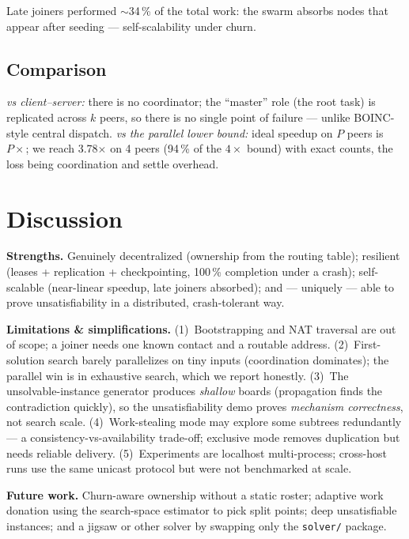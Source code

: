\documentclass[11pt,a4paper]{article}
\newcommand{\code}[1]{\texttt{#1}}
\begin{document}
Late joiners performed $\sim$34\,\% of the total work: the swarm absorbs nodes that appear after
seeding --- self-scalability under churn.

\subsection{Comparison}
\emph{vs client--server:} there is no coordinator; the ``master'' role (the root task) is
replicated across $k$ peers, so there is no single point of failure --- unlike BOINC-style
central dispatch. \emph{vs the parallel lower bound:} ideal speedup on $P$ peers is $P\times$; we
reach 3.78$\times$ on 4 peers (94\,\% of the $4\times$ bound) with exact counts, the loss being
coordination and settle overhead.

\section{Discussion}\label{sec:discussion}

\textbf{Strengths.} Genuinely decentralized (ownership from the routing table); resilient (leases
+ replication + checkpointing, 100\,\% completion under a crash); self-scalable (near-linear
speedup, late joiners absorbed); and --- uniquely --- able to prove unsatisfiability in a
distributed, crash-tolerant way.

\textbf{Limitations \& simplifications.} (1)~Bootstrapping and NAT traversal are out of scope; a
joiner needs one known contact and a routable address. (2)~First-solution search barely
parallelizes on tiny inputs (coordination dominates); the parallel win is in exhaustive search,
which we report honestly. (3)~The unsolvable-instance generator produces \emph{shallow} boards
(propagation finds the contradiction quickly), so the unsatisfiability demo proves \emph{mechanism
correctness}, not search scale. (4)~Work-stealing mode may explore some subtrees redundantly --- a
consistency-vs-availability trade-off; exclusive mode removes duplication but needs reliable
delivery. (5)~Experiments are localhost multi-process; cross-host runs use the same unicast
protocol but were not benchmarked at scale.

\textbf{Future work.} Churn-aware ownership without a static roster; adaptive work donation using
the search-space estimator to pick split points; deep unsatisfiable instances; and a jigsaw or
other solver by swapping only the \code{solver/} package.
\end{document}
